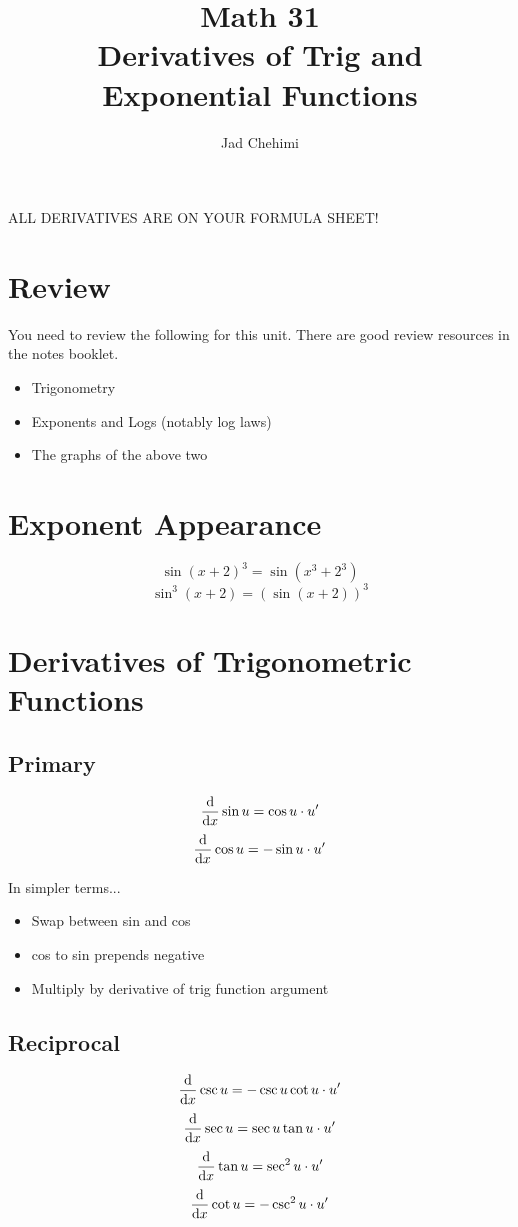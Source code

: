 \documentclass[a4paper,12pt]{article}
\title{Math 31 \\ Derivatives of Trig and Exponential Functions}
\author{Jad Chehimi}
\begin{document}
\maketitle

\tableofcontents

\pagebreak

\begin{center}
ALL DERIVATIVES ARE ON YOUR FORMULA SHEET!
\end{center}

\section{Review}
You need to review the following for this unit. There are good review resources in the notes booklet.

\begin{itemize}
    \item{Trigonometry}
    \item{Exponents and Logs (notably log laws)}
    \item{The graphs of the above two}
\end{itemize}

\section{Exponent Appearance}
$$\sin{(x + 2)^3} = \sin{(x^3 + 2^3)}$$
$$\sin^3{(x + 2)} = (\sin{(x + 2)})^3$$

\section{Derivatives of Trigonometric Functions}
\subsection{Primary}
$$\dv{}{x} \sin{u} = \cos{u} \cdot u'$$
$$\dv{}{x} \cos{u} = -\sin{u} \cdot u'$$

In simpler terms...
\begin{itemize}
    \item{Swap between sin and cos}
    \item{cos to sin prepends negative}
    \item{Multiply by derivative of trig function argument}
\end{itemize}

\subsection{Reciprocal}
$$\dv{}{x} \csc{u} = -\csc{u}\cot{u} \cdot u'$$
$$\dv{}{x} \sec{u} = \sec{u}\tan{u} \cdot u'$$
$$\dv{}{x} \tan{u} = \sec^2{u} \cdot u'$$
$$\dv{}{x} \cot{u} = -\csc^2{u} \cdot u'$$
\end{document}
